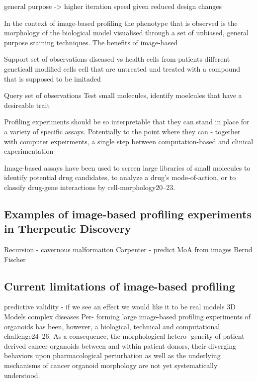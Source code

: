 \begin{flushleft}
general purpose -> higher iteration speed given reduced design changes





In the context of image-based profiling the phenotype that is observed is the morphology of the biological model visualised through a set of unbiased, general purpose staining techniques. The benefits of image-based 


Support set of observations
diseased vs health cells from patients
different geneticall modified cells 
cell that are untreated und treated with a compound that is supposed to be imitaded 

Query set of observations
Test small molecules, identify moelcules that have a desireable trait

Profiling experiments should be so interpretable that they can stand in place for a variety of specific assays. Potentially to the point where they can - together with computer expeirments, a single step between computation-based and clinical experimentation


Image-based assays have been used to screen large libraries of small molecules to identify potential drug candidates, to analyze a drug’s mode-of-action, or to classify drug-gene interactions by cell-morphology20–23. 

\subsection{Examples of image-based profiling experiments in Therpeutic Discovery}

Recursion - cavernous malformaiton
Carpenter - predict MoA from images
Bernd Fischer



\subsection{Current limitations of image-based profiling}

predictive validity - if we see an effect we would like it to be real
models 3D Models
complex diseases 
Per- forming large image-based profiling experiments of organoids has been, however, a biological, technical and computational challenge24–26. As a consequence, the morphological hetero- geneity of patient-derived cancer organoids between and within patient donors, their diverging behaviors upon pharmacological perturbation as well as the underlying mechanisms of cancer organoid morphology are not yet systematically understood.



\end{flushleft}
